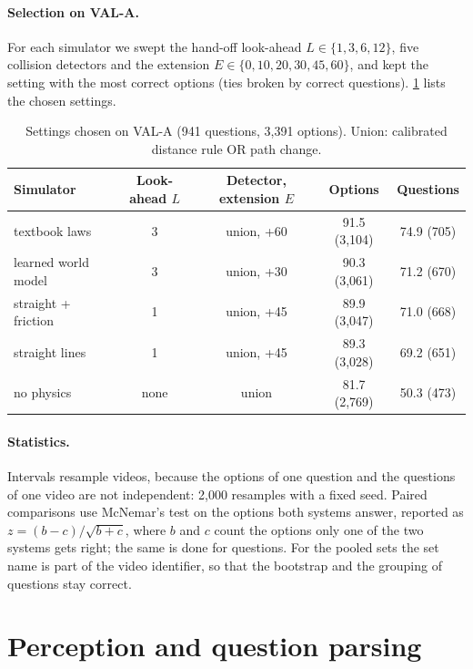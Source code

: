 \paragraph{Selection on VAL-A.}
For each simulator we swept the hand-off look-ahead $L \in \{1,3,6,12\}$, five collision detectors and the extension $E \in \{0,10,20,30,45,60\}$, and kept the setting with the most correct options (ties broken by correct questions).
\cref{tab:val} lists the chosen settings.

\begin{table}[h]
\caption{Settings chosen on VAL-A (941 questions, 3,391 options). Union: calibrated distance rule OR path change.}
\label{tab:val}
\centering
\small
\begin{tabular}{@{}lcccc@{}}
\toprule
Simulator & Look-ahead $L$ & Detector, extension $E$ & Options & Questions \\
\midrule
textbook laws & 3 & union, +60 & 91.5 (3,104) & 74.9 (705) \\
learned world model & 3 & union, +30 & 90.3 (3,061) & 71.2 (670) \\
straight + friction & 1 & union, +45 & 89.9 (3,047) & 71.0 (668) \\
straight lines & 1 & union, +45 & 89.3 (3,028) & 69.2 (651) \\
no physics & none & union & 81.7 (2,769) & 50.3 (473) \\
\bottomrule
\end{tabular}
\end{table}

\paragraph{Statistics.}
Intervals resample videos, because the options of one question and the questions of one video are not independent: 2,000 resamples with a fixed seed.
Paired comparisons use McNemar's test on the options both systems answer, reported as $z = (b - c)/\sqrt{b+c}$, where $b$ and $c$ count the options only one of the two systems gets right; the same is done for questions.
For the pooled sets the set name is part of the video identifier, so that the bootstrap and the grouping of questions stay correct.

\section{Perception and question parsing}
\label{app:perception}
\label{app:parser}

